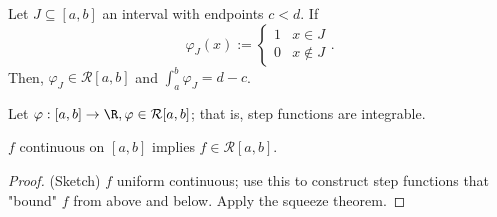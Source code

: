 \begin{lemma}[BS-7.2.4]
    Let $J \subseteq [a, b]$ an interval with endpoints $c < d$. If $$\varphi_J(x) := \begin{cases}
        1 & x \in J\\
        0 & x \notin J
    \end{cases}.$$ Then, $\varphi_J \in \mathcal{R}[a, b]$ and $\int_a^b \varphi_J = d- c$.
\end{lemma}

\begin{theorem}
    Let $\varphi : [a, b] \to \R, \varphi \in \mathcal{R}[a,b]$; that is, step functions are integrable.
\end{theorem}

\begin{theorem}
    $f$ continuous on $[a, b]$ implies $f \in \mathcal{R}[a, b]$.
\end{theorem}
\begin{proof}(Sketch)
    $f$ uniform continuous; use this to construct step functions that "bound" $f$ from above and below. Apply the squeeze theorem.
\end{proof}